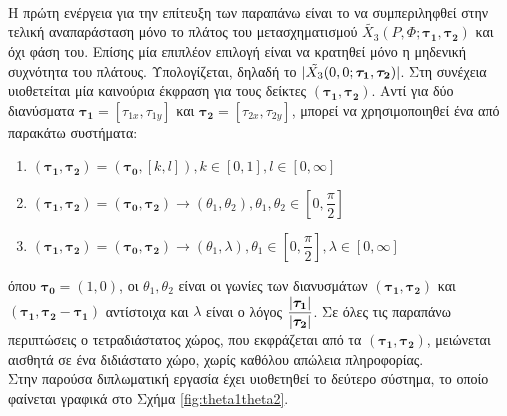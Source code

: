 \paragraph*{}
Η πρώτη ενέργεια για την επίτευξη των παραπάνω είναι το να συμπεριληφθεί στην τελική αναπαράσταση μόνο το πλάτος του μετασχηματισμού $\tilde{X_3}(P,\Phi;\boldsymbol{\tau_1},\boldsymbol{\tau_2})$ και όχι φάση του. Επίσης μία επιπλέον επιλογή είναι να κρατηθεί μόνο η μηδενική συχνότητα του πλάτους. Υπολογίζεται, δηλαδή το $\lvert\tilde{X_3}(0,0;\boldsymbol{\tau_1},\boldsymbol{\tau_2})\rvert$. Στη συνέχεια υιοθετείται μία καινούρια έκφραση για τους δείκτες $(\boldsymbol{\tau_1},\boldsymbol{\tau_2})$. Αντί για δύο διανύσματα $\boldsymbol{\tau_1}=[\tau_{1x}, \tau_{1y}]$ και $\boldsymbol{\tau_2}=[\tau_{2x}, \tau_{2y}]$, μπορεί να χρησιμοποιηθεί ένα από παρακάτω συστήματα:
\begin{enumerate}
\item
$(\boldsymbol{\tau_1},\boldsymbol{\tau_2}) = (\boldsymbol{\tau_0},[k,l]), k\in[0,1], l\in[0,\infty]$
\item
$(\boldsymbol{\tau_1},\boldsymbol{\tau_2}) = (\boldsymbol{\tau_0},\boldsymbol{\tau_2})\rightarrow(\theta_1,\theta_2), \theta_1,\theta_2\in\left[0,\dfrac{\pi}{2}\right]$
\item
$(\boldsymbol{\tau_1},\boldsymbol{\tau_2}) = (\boldsymbol{\tau_0},\boldsymbol{\tau_2})\rightarrow(\theta_1,\lambda), \theta_1\in\left[0,\dfrac{\pi}{2}\right], \lambda\in[0,\infty]$
\end{enumerate}
όπου $\boldsymbol{\tau_0} = (1,0)$, οι $\theta_1, \theta_2$ είναι οι γωνίες των διανυσμάτων $(\boldsymbol{\tau_1},\boldsymbol{\tau_2})$ και $(\boldsymbol{\tau_1},\boldsymbol{\tau_2}-\boldsymbol{\tau_1})$ αντίστοιχα και $\lambda$ είναι ο λόγος $\dfrac{\lvert\boldsymbol{\tau_1}\rvert}{\lvert\boldsymbol{\tau_2}\rvert}$. Σε όλες τις παραπάνω περιπτώσεις ο τετραδιάστατος χώρος, που εκφράζεται από τα $(\boldsymbol{\tau_1},\boldsymbol{\tau_2})$, μειώνεται αισθητά σε ένα διδιάστατο χώρο, χωρίς καθόλου απώλεια πληροφορίας.\\
Στην παρούσα διπλωματική εργασία έχει υιοθετηθεί το δεύτερο σύστημα, το οποίο φαίνεται γραφικά στο Σχήμα \ref{fig:theta1theta2}.

